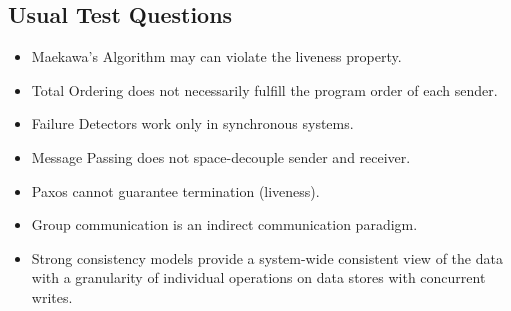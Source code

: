 \subsection{Usual Test Questions}

\begin{itemize}
    \item Maekawa's Algorithm may can violate the liveness property.
    \item Total Ordering does not necessarily fulfill the program order of each sender.
    \item Failure Detectors work only in synchronous systems.
    \item Message Passing does not space-decouple sender and receiver.
    \item Paxos cannot guarantee termination (liveness).
    \item Group communication is an indirect communication paradigm.
    \item Strong consistency models provide a system-wide consistent view of the data with a granularity of individual operations on data stores with concurrent writes.
\end{itemize}
